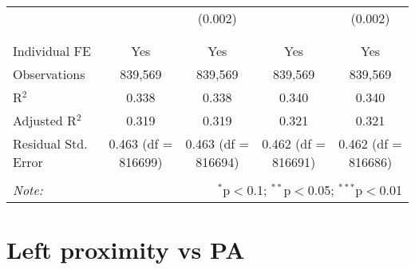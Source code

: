\documentclass[
]{article}
\begin{document}
\begin{table}[!htbp]
{\begin{tabular}{@{\extracolsep{5pt}}lcccc}
  &  & (0.002) &  & (0.002) \\ 
  & & & & \\ 
\hline \\[-1.8ex] 
Individual FE & Yes & Yes & Yes & Yes \\ 
Observations & 839,569 & 839,569 & 839,569 & 839,569 \\ 
R$^{2}$ & 0.338 & 0.338 & 0.340 & 0.340 \\ 
Adjusted R$^{2}$ & 0.319 & 0.319 & 0.321 & 0.321 \\ 
Residual Std. Error & 0.463 (df = 816699) & 0.463 (df = 816694) & 0.462 (df = 816691) & 0.462 (df = 816686) \\ 
\hline 
\hline \\[-1.8ex] 
\textit{Note:}  & \multicolumn{4}{r}{$^{*}$p$<$0.1; $^{**}$p$<$0.05; $^{***}$p$<$0.01} \\ 
\end{tabular}
} 
\end{table} 
\newpage
\section{Left proximity vs PA}
\end{document}
